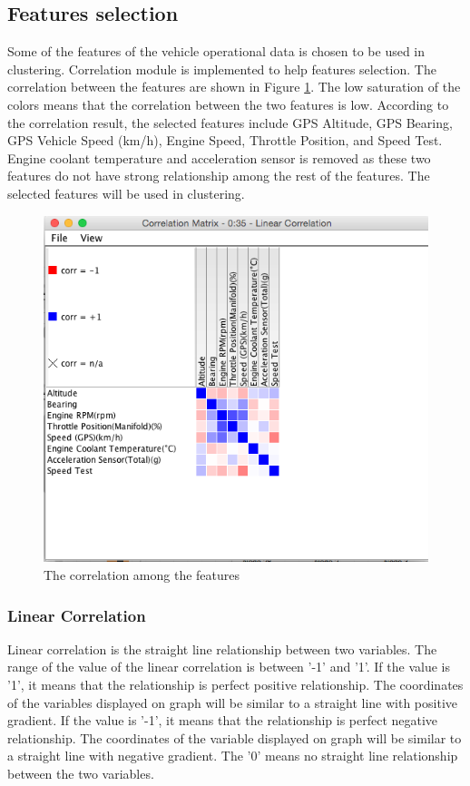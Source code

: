 \subsection{Features selection}
Some of the features of the vehicle operational data is chosen to be used in clustering. Correlation module is implemented to help features selection. The correlation between the features are shown in Figure \ref{fig:correlation}. The low saturation of the colors means that the correlation between the two features is low. According to the correlation result, the selected features include GPS Altitude, GPS Bearing, GPS Vehicle Speed (km/h), Engine Speed, Throttle Position, and Speed Test. Engine coolant temperature and acceleration sensor is removed as these two features do not have strong relationship among the rest of the features. The selected features will be used in clustering.

\begin{figure}[hbt!]\centering
\includegraphics[height=.5\textwidth]{image/KNIMEcorrelation}
\caption{The correlation among the features}
\label{fig:correlation}
\end{figure}

\subsubsection{Linear Correlation}
Linear correlation is the straight line relationship between two variables. The range of the value of the linear correlation is between '-1' and '1'. If the value is '1', it means that the relationship is perfect positive relationship. The coordinates of the variables displayed on graph will be similar to a straight line with positive gradient. If the value is '-1', it means that the relationship is perfect negative relationship. The coordinates of the variable displayed on graph will be similar to a straight line with negative gradient. The '0' means no straight line relationship between the two variables.

